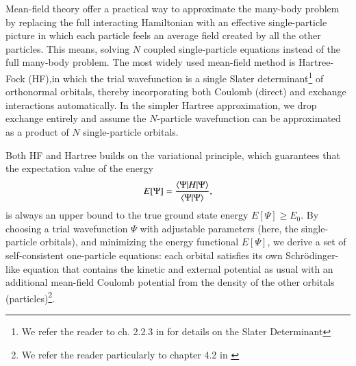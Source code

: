 \documentclass{subfiles}
\begin{document}
Mean-field theory offer a practical way to approximate the many-body problem by replacing the full interacting Hamiltonian with an effective single-particle picture in which each particle feels an average field created by all the other particles. This means, solving $N$ coupled single-particle equations instead of the full many-body problem. The most widely used mean-field method is Hartree-Fock (HF),in which the trial wavefunction is a single Slater determinant\footnote{We refer the reader to ch. 2.2.3 in \cite{szabo1996modern} for details on the Slater Determinant} of orthonormal orbitals, thereby incorporating both Coulomb (direct) and exchange interactions automatically. In the simpler Hartree approximation, we drop exchange entirely and assume the $N$-particle wavefunction can be approximated as a product of $N$ single-particle orbitals.

Both HF and Hartree builds on the variational principle, which guarantees that the expectation value of the energy
\begin{equation}
    E[\Psi] = \frac{\braket{\Psi|H|\Psi}}{\braket{\Psi|\Psi}}\label{eq:variational_principle},
\end{equation}
is always an upper bound to the true ground state energy $E[\Psi]\geq E_0$. By choosing a trial wavefunction $\Psi$ with adjustable parameters (here, the single-particle orbitals), and minimizing the energy functional $E[\Psi]$, we derive a set of self-consistent one-particle equations: each orbital satisfies its own Schrödinger-like equation that contains the kinetic and external potential as usual with an additional mean-field Coulomb potential from the density of the other orbitals (particles)\cite{helgaker2013molecular}\footnote{We refer the reader particularly to chapter 4.2 in \cite{helgaker2013molecular}}.
\end{document}
